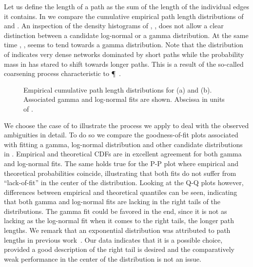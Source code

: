 		Let us define the length of a path as the sum of the length of the individual edges it contains. In  we compare the cumulative empirical path length distributions of  and . An inspection of the density histograms of , , does not allow a clear distinction between a candidate log-normal or a gamma distribution. At the same time , , seems to tend towards a gamma distribution. Note that the distribution of  indicates very dense networks dominated by short paths while the probability mass in  has stared to shift towards longer paths. This is a result of the so-called coarsening process characteristic to \P~\cite{baumgarten2010plasmodial}.

		\begin{figure}
			\centering

			\caption[Path length distribution]{Empirical cumulative path length distributions for  (a) and  (b). Associated gamma and log-normal fits are shown. Abscissa in units of \si{\pixel}.}
			\label{fig:path_lengths}
		\end{figure}

		We choose the case of  to illustrate the process we apply to deal with the observed ambiguities in detail. To do so we compare the goodness-of-fit plots associated with fitting a gamma, log-normal distribution and other candidate distributions in . Empirical and theoretical CDFs are in excellent agreement for both gamma and log-normal fits. The same holds true for the P-P plot where empirical and theoretical probabilities coincide, illustrating that both fits do not suffer from ``lack-of-fit'' in the center of the distribution. Looking at the Q-Q plots however, differences between empirical and theoretical quantiles can be seen, indicating that both gamma and log-normal fits are lacking in the right tails of the distributions. The gamma fit could be favored in the end, since it is not as lacking as the log-normal fit when it comes to the right tails, \ie the longer path lengths. We remark that an exponential distribution was attributed to path lengths in previous work~\cite{baumgarten2010plasmodial}. Our data indicates that it is a possible choice, provided a good description of the right tail is desired and the comparatively weak performance in the center of the distribution is not an issue.

